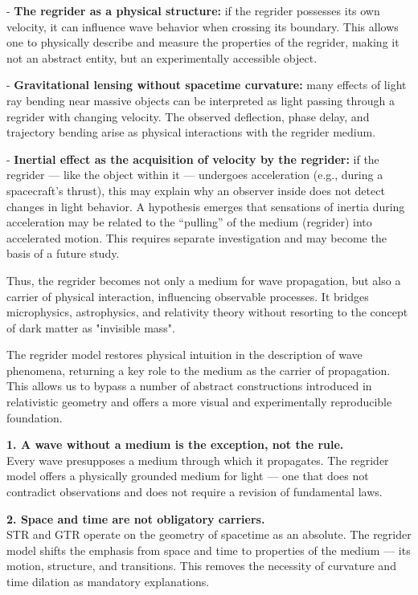 \documentclass[12pt]{article}
\begin{document}
- \textbf{The regrider as a physical structure:} if the regrider possesses its own velocity, it can influence wave behavior when crossing its boundary. This allows one to physically describe and measure the properties of the regrider, making it not an abstract entity, but an experimentally accessible object.

- \textbf{Gravitational lensing without spacetime curvature:} many effects of light ray bending near massive objects can be interpreted as light passing through a regrider with changing velocity. The observed deflection, phase delay, and trajectory bending arise as physical interactions with the regrider medium.

- \textbf{Inertial effect as the acquisition of velocity by the regrider:} if the regrider — like the object within it — undergoes acceleration (e.g., during a spacecraft’s thrust), this may explain why an observer inside does not detect changes in light behavior. A hypothesis emerges that sensations of inertia during acceleration may be related to the “pulling” of the medium (regrider) into accelerated motion. This requires separate investigation and may become the basis of a future study.

Thus, the regrider becomes not only a medium for wave propagation, but also a carrier of physical interaction, influencing observable processes. It bridges microphysics, astrophysics, and relativity theory without resorting to the concept of dark matter as "invisible mass".

The regrider model restores physical intuition in the description of wave phenomena, returning a key role to the medium as the carrier of propagation. This allows us to bypass a number of abstract constructions introduced in relativistic geometry and offers a more visual and experimentally reproducible foundation.

\textbf{1. A wave without a medium is the exception, not the rule.}\\
Every wave presupposes a medium through which it propagates. The regrider model offers a physically grounded medium for light — one that does not contradict observations and does not require a revision of fundamental laws.

\textbf{2. Space and time are not obligatory carriers.}\\
STR and GTR operate on the geometry of spacetime as an absolute. The regrider model shifts the emphasis from space and time to properties of the medium — its motion, structure, and transitions. This removes the necessity of curvature and time dilation as mandatory explanations.
\end{document}
